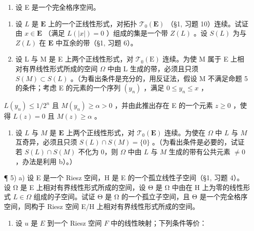 \begin{enumerate}
\def\labelenumi{\arabic{enumi})}
\setcounter{enumi}{3}
\tightlist
\item
  设 E 是一个完全格序空间。
\end{enumerate}

\begin{enumerate}
\def\labelenumi{\alph{enumi})}
\item
  设 \(L\) 是 \(\mathbf{E}\) 上的一个正线性形式，对拓扑 \(\mathcal{T}_0(\mathbf{E})\) （§1, 习题 10）连续。试证由 \(x \in \mathbf{E}\) （满足 \(L(|x|) = 0\) ）组成的集是一个带 \(Z(L)\) 。设 \(S(L)\) 为与 \(Z(L)\) 在 \(\mathbf{E}\) 中互余的带（§1, 习题 6）。
\item
  设 L 与 M 是 E 上两个正线性形式，对 \(\mathcal{T}_{0}(\mathrm{E})\) 连续。为使 M 属于 E 上相对有界线性形式所成的空间 \(\Omega\) 中由 L 生成的带，必须且只须 \(S(M) \subset S(L)\) 。（为看出条件是充分的，用反证法，假设 M 不满足命题 5 的条件；考虑 E 的元素的一个序列 \((y_{n})\) ，满足 \(0 \leqslant y_{n} \leqslant x\) ，
\end{enumerate}

\(L(y_{n}) \leqslant 1 / 2^{n}\) 且 \(M(y_{n}) \geqslant \alpha > 0\) ，并由此推出存在 E 的一个元素 \(z \geqslant 0\) ，使得 \(L(z) = 0\) 且 \(M(z) \geqslant \alpha\) 。

\begin{enumerate}
\def\labelenumi{\alph{enumi})}
\setcounter{enumi}{2}
\tightlist
\item
  设 \(L\) 与 \(M\) 是 \(\mathbf{E}\) 上两个正线性形式，对 \(\mathcal{T}_0(\mathbf{E})\) 连续。为使在 \(\Omega\) 中 \(L\) 与 \(M\) 互奇异，必须且只须 \(S(L) \cap S(M) = \{0\}\) 。（为看出条件是必要的，试证若 \(S(L) \cap S(M)\) 不化为 0，则 \(\Omega\) 中由 \(L\) 与 \(M\) 生成的带有公共元素 \(\neq 0\) ，办法是利用 b）。）
\end{enumerate}

¶ 5) a) 设 E 是一个 Riesz 空间，H 是 E 的一个孤立线性子空间（§1, 习题 4）。设 Ω 是 E 上相对有界线性形式所成的空间，设 Θ 是 Ω 中由在 H 上为零的线性形式 \(L \in \Omega\) 组成的子空间。试证 Θ 是 Ω 的一个孤立子空间，且 Θ 是一个完全格序空间，同构于 Riesz 空间 E/H 上相对有界线性形式所成的空间。

\begin{enumerate}
\def\labelenumi{\alph{enumi})}
\setcounter{enumi}{1}
\tightlist
\item
  设 \(u\) 是 \(E\) 到一个 Riesz 空间 \(F\) 中的线性映射；下列条件等价：
\end{enumerate}

